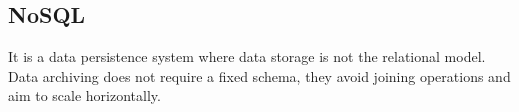 \section{}


\subsection*{NoSQL}
It is a data persistence system where data storage is not the relational model. Data archiving does not require a fixed schema, they avoid joining operations and aim to scale horizontally. 